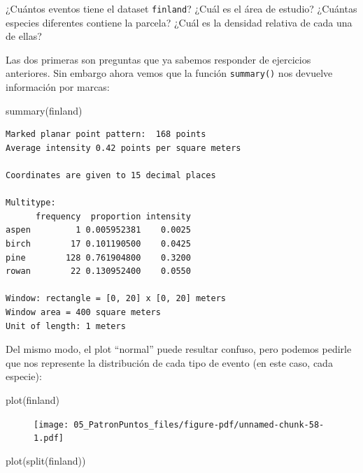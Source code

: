 \documentclass[
  letterpaper,
  DIV=11,
  numbers=noendperiod]{scrreprt}
\newenvironment{Shaded}{\begin{snugshade}}{\end{snugshade}}
\newcommand{\FunctionTok}[1]{\textcolor[rgb]{0.28,0.35,0.67}{#1}}
\newcommand{\NormalTok}[1]{\textcolor[rgb]{0.00,0.23,0.31}{#1}}
\begin{document}
¿Cuántos eventos tiene el dataset \texttt{finland}? ¿Cuál es el área de
estudio? ¿Cuántas especies diferentes contiene la parcela? ¿Cuál es la
densidad relativa de cada una de ellas?

Las dos primeras son preguntas que ya sabemos responder de ejercicios
anteriores. Sin embargo ahora vemos que la función \texttt{summary()}
nos devuelve información por marcas:

\begin{Shaded}
\begin{Highlighting}[]
\FunctionTok{summary}\NormalTok{(finland)}
\end{Highlighting}
\end{Shaded}

\begin{verbatim}
Marked planar point pattern:  168 points
Average intensity 0.42 points per square meters

Coordinates are given to 15 decimal places

Multitype:
      frequency  proportion intensity
aspen         1 0.005952381    0.0025
birch        17 0.101190500    0.0425
pine        128 0.761904800    0.3200
rowan        22 0.130952400    0.0550

Window: rectangle = [0, 20] x [0, 20] meters
Window area = 400 square meters
Unit of length: 1 meters
\end{verbatim}

Del mismo modo, el plot ``normal'' puede resultar confuso, pero podemos
pedirle que nos represente la distribución de cada tipo de evento (en
este caso, cada especie):

\begin{Shaded}
\begin{Highlighting}[]
\FunctionTok{plot}\NormalTok{(finland)}
\end{Highlighting}
\end{Shaded}

\begin{figure}[H]

{\centering \texttt{[image: 05\_PatronPuntos\_files/figure-pdf/unnamed-chunk-58-1.pdf]}

}

\end{figure}

\begin{Shaded}
\begin{Highlighting}[]
\FunctionTok{plot}\NormalTok{(}\FunctionTok{split}\NormalTok{(finland))}
\end{Highlighting}
\end{Shaded}
\end{document}
